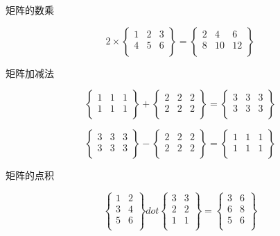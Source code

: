\documentclass[UTF8,16pt]{ctexart}
\begin{document}
矩阵的数乘

{\color{white} \Huge
$$
2 \times \left\{
 \begin{matrix}
   1 & 2 & 3\\
   4 & 5 & 6\\
  \end{matrix}
  \right\}=\left\{
 \begin{matrix}
   2 & 4 & 6\\
   8 & 10 & 12\\
  \end{matrix}
  \right\}
$$
 }


矩阵加减法

{\color{white} 
$$
\left\{
 \begin{matrix}
   1 & 1 & 1\\
   1 & 1 & 1\\
  \end{matrix}
  \right\} + 
\left\{
 \begin{matrix}
   2 & 2 & 2\\
   2 & 2 & 2\\
  \end{matrix}
  \right\}=\left\{
 \begin{matrix}
   3 & 3 & 3\\
   3 & 3 & 3\\
  \end{matrix}
  \right\}
$$
 }

{\color{white} 
$$
\left\{
 \begin{matrix}
   3 & 3 & 3\\
   3 & 3 & 3\\
  \end{matrix}
  \right\} - 
\left\{
 \begin{matrix}
   2 & 2 & 2\\
   2 & 2 & 2\\
  \end{matrix}
  \right\}=\left\{
 \begin{matrix}
   1 & 1 & 1\\
   1 & 1 & 1\\
  \end{matrix}
  \right\}
$$
 }

矩阵的点积

{\color{white} 
$$
\left\{
 \begin{matrix}
   1 & 2\\
   3 & 4\\
   5 & 6\\
  \end{matrix}
  \right\} dot 
\left\{
 \begin{matrix}
   3 & 3\\
   2 & 2\\
   1 & 1\\
  \end{matrix}
  \right\}=\left\{
 \begin{matrix}
   3 & 6\\
   6 & 8\\
   5 & 6\\
  \end{matrix}
  \right\}
$$
 }
\end{document}
